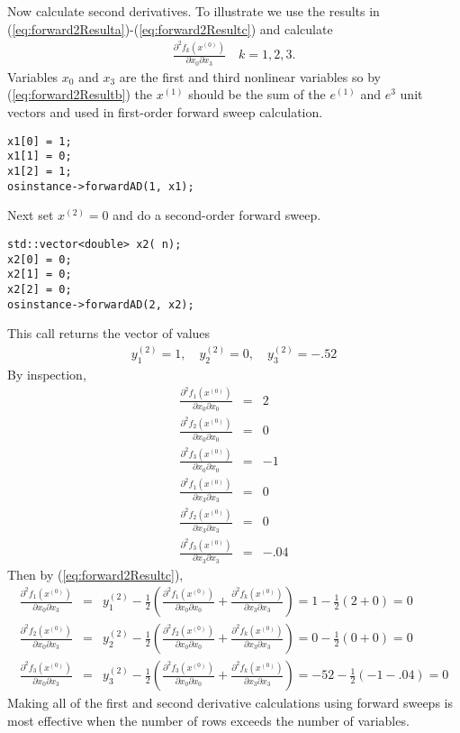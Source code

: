 \documentclass[11pt]{article}
\newcommand{\DD}[3]{ \frac{\partial^2 #1}{\partial #2 \partial #3} }
\renewcommand{\_}{{\char"5F}}
\renewcommand{\{}{{\char"7B}}
\renewcommand{\}}{{\char"7D}}
\renewcommand{\^}{{\char"0D}}
\renewcommand{\'}{{\char"0D}}
\begin{document}
Now calculate second derivatives.  To illustrate we use the results in (\ref{eq:forward2Resulta})-(\ref{eq:forward2Resultc}) and calculate
\begin{eqnarray*}
\DD{f_{k}(x^{(0)})}{x_{0}}{x_{3}} \quad k = 1, 2, 3.
\end{eqnarray*}
Variables $x_{0}$ and $x_{3}$ are the first and third nonlinear variables so by  (\ref{eq:forward2Resultb}) the $x^{(1)}$ should be the sum of the $e^{(1)}$ and $e^{3}$ unit vectors and used in first-order forward sweep calculation.
\begin{verbatim}
x1[0] = 1;
x1[1] = 0;
x1[2] = 1;
osinstance->forwardAD(1, x1);
\end{verbatim}
Next set $x^{(2)} = 0$ and do a second-order forward sweep.
\begin{verbatim}
std::vector<double> x2( n);
x2[0] = 0;
x2[1] = 0;
x2[2] = 0;
osinstance->forwardAD(2, x2);
\end{verbatim}
This call returns the vector of  values
\begin{eqnarray*}
y_{1}^{(2)}  = 1, \quad y_{2}^{(2)}  = 0, \quad y_{3}^{(2)} = -.52
\end{eqnarray*}
By inspection,
\begin{eqnarray*}
\DD{f_{1}(x^{(0)})}{x_{0}}{x_{0}} &=& 2 \\
\DD{f_{2}(x^{(0)})}{x_{0}}{x_{0}} &=&  0\\
\DD{f_{3}(x^{(0)})}{x_{0}}{x_{0}} &=& -1 \\
\DD{f_{1}(x^{(0)})}{x_{3}}{x_{3}} &=& 0 \\
\DD{f_{2}(x^{(0)})}{x_{3}}{x_{3}} &=& 0\\
\DD{f_{3}(x^{(0)})}{x_{3}}{x_{3}} &=& -.04
\end{eqnarray*}
Then by (\ref{eq:forward2Resultc}),
\begin{eqnarray*}
\DD{f_{1}(x^{(0)})}{x_{0}}{x_{3}} &=&  y_{1}^{(2)}  -  \frac{1}{2} \left( \DD{f_{1}(x^{(0)})}{x_{0}}{x_{0}}  +  \DD{f_{k}(x^{(0)})}{x_{3}}{x_{3}}  \right) =   1 -  \frac{1}{2}(2 +  0) = 0 \\
\DD{f_{2}(x^{(0)})}{x_{0}}{x_{3}} &=&   y_{2}^{(2)}  -  \frac{1}{2} \left( \DD{f_{2}(x^{(0)})}{x_{0}}{x_{0}}  +  \DD{f_{k}(x^{(0)})}{x_{3}}{x_{3}}  \right)  = 0 -  \frac{1}{2}(0 +  0) = 0 \\
\DD{f_{3}(x^{(0)})}{x_{0}}{x_{3}} &=&  y_{3}^{(2)}  -  \frac{1}{2} \left( \DD{f_{3}(x^{(0)})}{x_{0}}{x_{0}}  +  \DD{f_{k}(x^{(0)})}{x_{3}}{x_{3}}  \right) = -52 -  \frac{1}{2}(-1 - .04) = 0
\end{eqnarray*}
Making all of the first and second derivative calculations using forward sweeps is most effective when the number of rows exceeds the number of variables.
\end{document}
